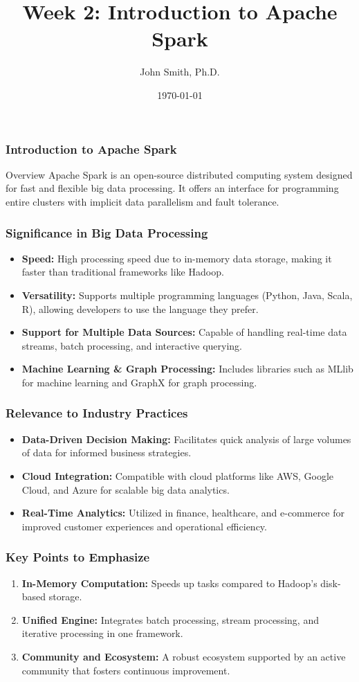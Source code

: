 \documentclass[aspectratio=169]{beamer}
\title[Apache Spark Introduction]{Week 2: Introduction to Apache Spark}
\author[J. Smith]{John Smith, Ph.D.}
\institute[University Name]{
  Department of Computer Science\\
  University Name\\
  \vspace{0.3cm}
  Email: email@university.edu\\
  Website: www.university.edu
}
\date{\today}
\begin{document}
\frame{\titlepage}

\begin{frame}[fragile]
    \frametitle{Introduction to Apache Spark}
    \begin{block}{Overview}
        Apache Spark is an open-source distributed computing system designed for fast and flexible big data processing. It offers an interface for programming entire clusters with implicit data parallelism and fault tolerance.
    \end{block}
\end{frame}

\begin{frame}[fragile]
    \frametitle{Significance in Big Data Processing}
    \begin{itemize}
        \item \textbf{Speed:} High processing speed due to in-memory data storage, making it faster than traditional frameworks like Hadoop.
        \item \textbf{Versatility:} Supports multiple programming languages (Python, Java, Scala, R), allowing developers to use the language they prefer.
        \item \textbf{Support for Multiple Data Sources:} Capable of handling real-time data streams, batch processing, and interactive querying.
        \item \textbf{Machine Learning \& Graph Processing:} Includes libraries such as MLlib for machine learning and GraphX for graph processing.
    \end{itemize}
\end{frame}

\begin{frame}[fragile]
    \frametitle{Relevance to Industry Practices}
    \begin{itemize}
        \item \textbf{Data-Driven Decision Making:} Facilitates quick analysis of large volumes of data for informed business strategies.
        \item \textbf{Cloud Integration:} Compatible with cloud platforms like AWS, Google Cloud, and Azure for scalable big data analytics.
        \item \textbf{Real-Time Analytics:} Utilized in finance, healthcare, and e-commerce for improved customer experiences and operational efficiency.
    \end{itemize}
\end{frame}

\begin{frame}[fragile]
    \frametitle{Key Points to Emphasize}
    \begin{enumerate}
        \item \textbf{In-Memory Computation:} Speeds up tasks compared to Hadoop's disk-based storage.
        \item \textbf{Unified Engine:} Integrates batch processing, stream processing, and iterative processing in one framework.
        \item \textbf{Community and Ecosystem:} A robust ecosystem supported by an active community that fosters continuous improvement.
    \end{enumerate}
\end{frame}
\end{document}
